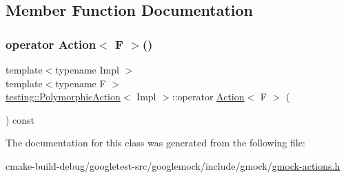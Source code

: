 \subsection{Member Function Documentation}
\mbox{\label{classtesting_1_1PolymorphicAction_ac35461616cc15c06f1a2f9ee1c03fb8f}} 
\subsubsection{\texorpdfstring{operator Action$<$ F $>$()}{operator Action< F >()}}
{\footnotesize\ttfamily template$<$typename Impl $>$ \\
template$<$typename F $>$ \\
\mbox{\hyperlink{classtesting_1_1PolymorphicAction}{testing\+::\+Polymorphic\+Action}}$<$ Impl $>$\+::operator \mbox{\hyperlink{classtesting_1_1Action}{Action}}$<$ F $>$ (\begin{DoxyParamCaption}{ }\end{DoxyParamCaption}) const\hspace{0.3cm}{\ttfamily [inline]}}



The documentation for this class was generated from the following file\+:\begin{DoxyCompactItemize}
\item 
cmake-\/build-\/debug/googletest-\/src/googlemock/include/gmock/\mbox{\hyperlink{gmock-actions_8h}{gmock-\/actions.\+h}}\end{DoxyCompactItemize}
